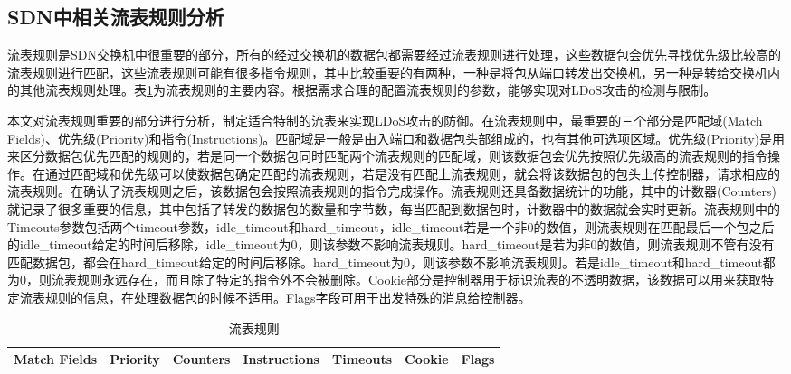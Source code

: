 \subsection{SDN中相关流表规则分析}
\label{chap4:flowruleanalysis}

流表规则是SDN交换机中很重要的部分，所有的经过交换机的数据包都需要经过流表规则进行处理，这些数据包会优先寻找优先级比较高的流表规则进行匹配，这些流表规则可能有很多指令规则，其中比较重要的有两种，一种是将包从端口转发出交换机，另一种是转给交换机内的其他流表规则处理。表\ref{table:flowrule}为流表规则的主要内容。根据需求合理的配置流表规则的参数，能够实现对LDoS攻击的检测与限制。

本文对流表规则重要的部分进行分析，制定适合特制的流表来实现LDoS攻击的防御。在流表规则中，最重要的三个部分是匹配域(Match Fields)、优先级(Priority)和指令(Instructions)。匹配域是一般是由入端口和数据包头部组成的，也有其他可选项区域。优先级(Priority)是用来区分数据包优先匹配的规则的，若是同一个数据包同时匹配两个流表规则的匹配域，则该数据包会优先按照优先级高的流表规则的指令操作。在通过匹配域和优先级可以使数据包确定匹配的流表规则，若是没有匹配上流表规则，就会将该数据包的包头上传控制器，请求相应的流表规则。在确认了流表规则之后，该数据包会按照流表规则的指令完成操作。流表规则还具备数据统计的功能，其中的计数器(Counters)就记录了很多重要的信息，其中包括了转发的数据包的数量和字节数，每当匹配到数据包时，计数器中的数据就会实时更新。流表规则中的Timeouts参数包括两个timeout参数，idle\_timeout和hard\_timeout，idle\_timeout若是一个非0的数值，则流表规则在匹配最后一个包之后的idle\_timeout给定的时间后移除，idle\_timeout为0，则该参数不影响流表规则。hard\_timeout是若为非0的数值，则流表规则不管有没有匹配数据包，都会在hard\_timeout给定的时间后移除。hard\_timeout为0，则该参数不影响流表规则。若是idle\_timeout和hard\_timeout都为0，则流表规则永远存在，而且除了特定的指令外不会被删除。Cookie部分是控制器用于标识流表的不透明数据，该数据可以用来获取特定流表规则的信息，在处理数据包的时候不适用。Flags字段可用于出发特殊的消息给控制器。


\begin{table}[htbp]
	\centering  %
	\caption{流表规则}  %
	\label{table:flowrule}  %
	\begin{tabular}{|c|c|c|c|c|c|c|}  
		\hline  %
        Match Fields & Priority & Counters & Instructions & Timeouts & Cookie & Flags \\  %
        \hline
		
	\end{tabular}
\end{table}

